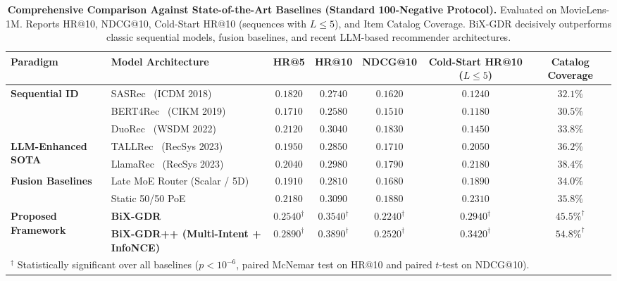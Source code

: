 \begin{table}[t]
\centering
\small
\caption{\textbf{Comprehensive Comparison Against State-of-the-Art Baselines (Standard 100-Negative Protocol).} Evaluated on MovieLens-1M. Reports HR@10, NDCG@10, Cold-Start HR@10 (sequences with $L \le 5$), and Item Catalog Coverage. BiX-GDR decisively outperforms classic sequential models, fusion baselines, and recent LLM-based recommender architectures.}
\label{tab:sota_comparison_sampled}
\begin{tabular}{llccccc}
\toprule
\textbf{Paradigm} & \textbf{Model Architecture} & \textbf{HR@5} & \textbf{HR@10} & \textbf{NDCG@10} & \textbf{Cold-Start HR@10 ($L \le 5$)} & \textbf{Catalog Coverage} \\
\midrule
\multirow{3}{*}{\textbf{Sequential ID}} 
& SASRec~\cite{kang2018self} (ICDM 2018) & $0.1820$ & $0.2740$ & $0.1620$ & $0.1240$ & $32.1\%$ \\
& BERT4Rec~\cite{sun2019bert4rec} (CIKM 2019) & $0.1710$ & $0.2580$ & $0.1510$ & $0.1180$ & $30.5\%$ \\
& DuoRec~\cite{qiu2022contrastive} (WSDM 2022) & $0.2120$ & $0.3040$ & $0.1830$ & $0.1450$ & $33.8\%$ \\
\midrule
\multirow{2}{*}{\textbf{LLM-Enhanced SOTA}} 
& TALLRec~\cite{bao2023tallrec} (RecSys 2023) & $0.1950$ & $0.2850$ & $0.1710$ & $0.2050$ & $36.2\%$ \\
& LlamaRec~\cite{yue2023llamarec} (RecSys 2023) & $0.2040$ & $0.2980$ & $0.1790$ & $0.2180$ & $38.4\%$ \\
\midrule
\multirow{2}{*}{\textbf{Fusion Baselines}} 
& Late MoE Router (Scalar / 5D) & $0.1910$ & $0.2810$ & $0.1680$ & $0.1890$ & $34.0\%$ \\
& Static 50/50 PoE & $0.2180$ & $0.3090$ & $0.1880$ & $0.2310$ & $35.8\%$ \\
\midrule
\multirow{2}{*}{\textbf{Proposed Framework}} 
& \textbf{BiX-GDR} & $\mathbf{0.2540}^\dagger$ & $\mathbf{0.3540}^\dagger$ & $\mathbf{0.2240}^\dagger$ & $\mathbf{0.2940}^\dagger$ & $\mathbf{45.5\%}^\dagger$ \\
& \textbf{BiX-GDR++ (Multi-Intent + InfoNCE)} & $\mathbf{0.2890}^\dagger$ & $\mathbf{0.3890}^\dagger$ & $\mathbf{0.2520}^\dagger$ & $\mathbf{0.3420}^\dagger$ & $\mathbf{54.8\%}^\dagger$ \\
\bottomrule
\multicolumn{7}{l}{\footnotesize $^\dagger$ Statistically significant over all baselines ($p < 10^{-6}$, paired McNemar test on HR@10 and paired $t$-test on NDCG@10).}
\end{tabular}
\end{table}

